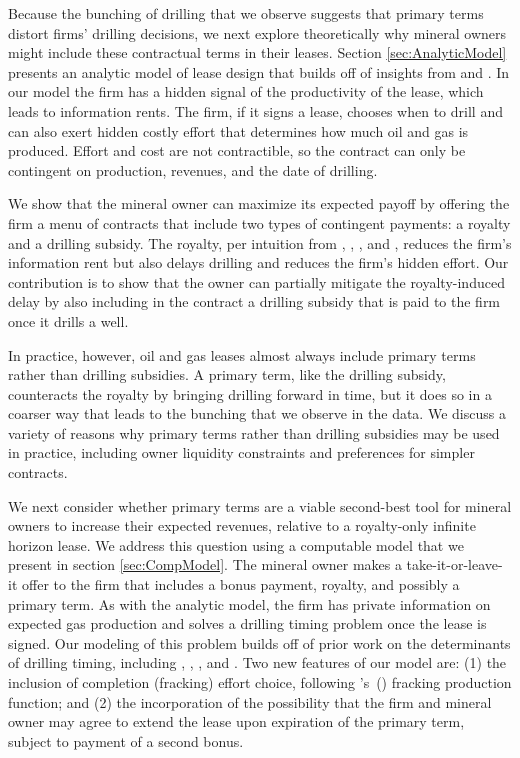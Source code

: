 \documentclass[12pt]{article}
\newcommand\cites[1]{\citeauthor{#1}'s\ (\citeyear{#1})}
\begin{document}
Because the bunching of drilling that we observe suggests that primary terms distort firms' drilling decisions, we next explore theoretically why mineral owners might include these contractual terms in their leases. Section \ref{sec:AnalyticModel} presents an analytic model of lease design that builds off of insights from \citet{bib:laffonttirole1986} and \citet{bib:board}. In our model the firm has a hidden signal of the productivity of the lease, which leads to information rents. The firm, if it signs a lease, chooses when to drill and can also exert hidden costly effort that determines how much oil and gas is produced. Effort and cost are not contractible, so the contract can only be contingent on production, revenues, and the date of drilling.

We show that the mineral owner can maximize its expected payoff by offering the firm a menu of contracts that include two types of contingent payments: a royalty and a drilling subsidy. The royalty, per intuition from \citet{bib:riley}, \citet{bib:hendricksporterguofo}, \citet{bib:bhattacharya}, and \citet{bib:ordin}, reduces the firm's information rent but also delays drilling and reduces the firm's hidden effort. Our contribution is to show that the owner can partially mitigate the royalty-induced delay by also including in the contract a drilling subsidy that is paid to the firm once it drills a well.

In practice, however, oil and gas leases almost always include primary terms rather than drilling subsidies. A primary term, like the drilling subsidy, counteracts the royalty by bringing drilling forward in time, but it does so in a coarser way that leads to the bunching that we observe in the data. We discuss a variety of reasons why primary terms rather than drilling subsidies may be used in practice, including owner liquidity constraints and preferences for simpler contracts.

We next consider whether primary terms are a viable second-best tool for mineral owners to increase their expected revenues, relative to a royalty-only infinite horizon lease. We address this question using a computable model that we present in section \ref{sec:CompModel}. The mineral owner makes a take-it-or-leave-it offer to the firm that includes a bonus payment, royalty, and possibly a primary term. As with the analytic model, the firm has private information on expected gas production and solves a drilling timing problem once the lease is signed. Our modeling of this problem builds off of prior work on the determinants of drilling timing, including \citet{bib:kellogg}, \citet{bib:bhattacharya}, \citet{bib:ordin}, and \citet{bib:agerton}. Two new features of our model are: (1) the inclusion of completion (fracking) effort choice, following \cites{bib:covert} fracking production function; and (2) the incorporation of the possibility that the firm and mineral owner may agree to extend the lease upon expiration of the primary term, subject to payment of a second bonus.
\end{document}

